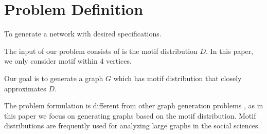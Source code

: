 \section{Problem Definition}
\label{sec:problem}
 To generate a network with desired specifications.

 The input of our problem consists of is the motif 
distribution $D$. In this paper, we only consider motif within 4 vertices.

 Our goal is to generate a graph $G$ which has motif distribution that closely
approximates $D$.

The problem formulation is different from other graph generation problems
\cite{erdds1959random, watts1998collective, albert2002statistical,
newman2009random, molloy1995critical}, as in this paper we focus on
generating graphs based on the motif distribution.
Motif distributions are frequently used for analyzing large graphs in the
social sciences.
